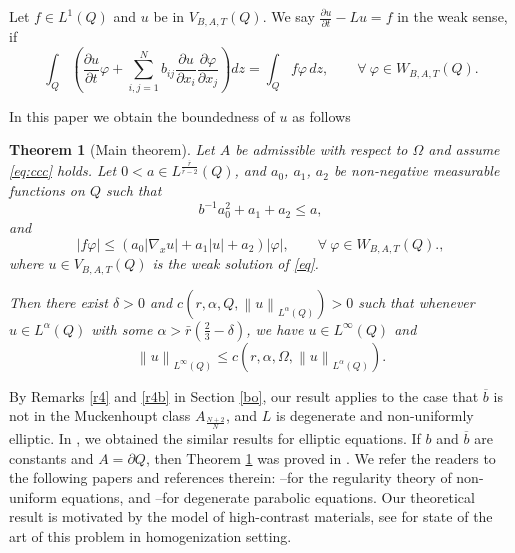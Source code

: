 \documentclass[11pt, a4paper]{article}
\newtheorem{theorem}{Theorem}%
\numberwithin{equation}{section}
\newcommand{\abs}[1]{\left\lvert #1\right\rvert}
\newcommand{\norm}[1]{\left\lVert #1\right\rVert}
\begin{document}
Let $f\in L^{1}(Q)$ and $u$ be in $V_{B,A,T}(Q)$. We say
$\displaystyle \frac{\partial u}{\partial t} -Lu=f$ in the weak sense,
if
\begin{equation}
  \int_{Q} \left(\frac{\partial u}{\partial t}\varphi+
    \sum_{i,j=1}^{N}b_{ij}\frac{\partial u}{\partial x_{i}}\frac{\partial
      \varphi}{\partial x_{j}} \right)dz = \int_{Q}f\varphi\, dz,
  \qquad \forall~\varphi \in W_{B,A,T}(Q).
 \label{eq}
\end{equation}

In this paper we obtain the boundedness of $u$ as follows


\begin{theorem}[Main theorem]
  Let $A$ be  admissible with respect to $\Omega$ and assume
\eqref{eq:ccc} holds. 
Let $0 < a\in L^{\frac{\overline{r}}{\overline{r}-2}}(Q)$, and $a_{0}$, $a_{1}$, $a_{2}$ be
non-negative measurable functions on $Q$ such that
\begin{equation}
b^{-1} a_{0}^{2}+a_{1}+ a_{2}\le a,
\label{th1:cc8}
\end{equation}
and
\begin{equation}
 \abs{f\varphi}\le \left(a_{0}\abs{\nabla_{x} u}+a_{1}\abs{u}  +a_{2} \right)\abs{\varphi},\qquad\forall~\varphi\in W_{B,A,T}(Q).
\label{elz},
\end{equation}
where $u\in V_{B,A,T}(Q)$ is the weak solution of \eqref{eq}.

Then there exist $\delta > 0$ and $c\left(r,\alpha,Q,\norm{u}_{L^{\alpha}(Q)} \right) > 0$ such that
whenever $u \in  L^{\alpha}(Q)$
with some $\alpha > \bar{r}\left( \frac{2}{3}-\delta
  \right)$, we have $u \in L^{\infty}(Q)$ and
\begin{equation}
  \norm{u}_{L^{\infty}(Q)}\le c \left(r,\alpha,\Omega,\norm{u}_{L^{\alpha}(Q)} \right). \label{th1:le460abc}
 \end{equation}

\label{th1}
\end{theorem}

By Remarks \ref{r4} and \ref{r4b} in Section \ref{bo}, our result applies to the case that $\overline{b}$ is not in the Muckenhoupt
class $A_{\frac{N+2}{N}}$, and $L$ is degenerate and non-uniformly
elliptic. In \cite{ducGlobalHolderContinuity}, we obtained the similar
results for elliptic equations. If $b$ and $\overline{b}$ are constants
and $A=\partial Q$, then Theorem \ref{th1} was proved in
\cite{ladyzenskajaLinearQuasilinearEquations1968}. We refer the
readers to the following papers and references therein:
\cite{defilippisSketchesNonuniformlyElliptic2025,defilippisNonuniformlyEllipticSchauder2023}--for the regularity theory of non-uniform equations, and
\cite{dongNondivergenceFormDegenerate2024,dongDegenerateLinearParabolic2023}--for degenerate parabolic equations. Our theoretical result is
motivated by the model of high-contrast materials, see
\cite{armstrongRenormalizationGroupElliptic2025} for state of the art
of this problem in homogenization setting.
\end{document}
